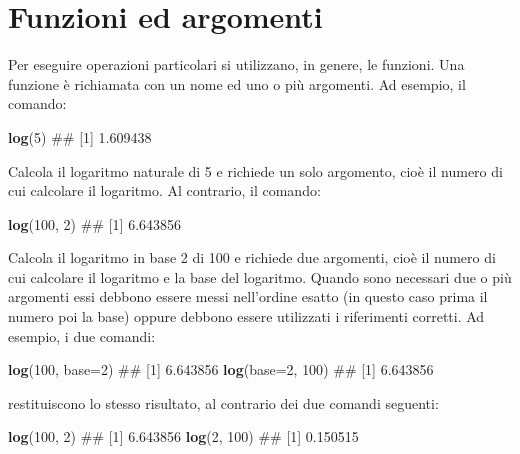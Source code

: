 \documentclass[a4paper,12pt,oneside]{book}
\newenvironment{Shaded}{\begin{snugshade}}{\end{snugshade}}
\newcommand{\KeywordTok}[1]{\textcolor[rgb]{0.13,0.29,0.53}{\textbf{#1}}}
\newcommand{\DataTypeTok}[1]{\textcolor[rgb]{0.13,0.29,0.53}{#1}}
\newcommand{\DecValTok}[1]{\textcolor[rgb]{0.00,0.00,0.81}{#1}}
\newcommand{\NormalTok}[1]{#1}
\theoremstyle{definition}
\theoremstyle{definition}
\theoremstyle{definition}
\theoremstyle{remark}
\begin{document}
\section*{Funzioni ed argomenti}\label{funzioni-ed-argomenti}

Per eseguire operazioni particolari si utilizzano, in genere, le
funzioni. Una funzione è richiamata con un nome ed uno o più argomenti.
Ad esempio, il comando:

\begin{Shaded}
\begin{Highlighting}[]
\KeywordTok{log}\NormalTok{(}\DecValTok{5}\NormalTok{)}
\NormalTok{## [1] 1.609438}
\end{Highlighting}
\end{Shaded}

Calcola il logaritmo naturale di 5 e richiede un solo argomento, cioè il
numero di cui calcolare il logaritmo. Al contrario, il comando:

\begin{Shaded}
\begin{Highlighting}[]
\KeywordTok{log}\NormalTok{(}\DecValTok{100}\NormalTok{, }\DecValTok{2}\NormalTok{)}
\NormalTok{## [1] 6.643856}
\end{Highlighting}
\end{Shaded}

Calcola il logaritmo in base 2 di 100 e richiede due argomenti, cioè il
numero di cui calcolare il logaritmo e la base del logaritmo. Quando
sono necessari due o più argomenti essi debbono essere messi nell'ordine
esatto (in questo caso prima il numero poi la base) oppure debbono
essere utilizzati i riferimenti corretti. Ad esempio, i due comandi:

\begin{Shaded}
\begin{Highlighting}[]
\KeywordTok{log}\NormalTok{(}\DecValTok{100}\NormalTok{, }\DataTypeTok{base=}\DecValTok{2}\NormalTok{)}
\NormalTok{## [1] 6.643856}
\KeywordTok{log}\NormalTok{(}\DataTypeTok{base=}\DecValTok{2}\NormalTok{, }\DecValTok{100}\NormalTok{)}
\NormalTok{## [1] 6.643856}
\end{Highlighting}
\end{Shaded}

restituiscono lo stesso risultato, al contrario dei due comandi
seguenti:

\begin{Shaded}
\begin{Highlighting}[]
\KeywordTok{log}\NormalTok{(}\DecValTok{100}\NormalTok{, }\DecValTok{2}\NormalTok{)}
\NormalTok{## [1] 6.643856}
\KeywordTok{log}\NormalTok{(}\DecValTok{2}\NormalTok{, }\DecValTok{100}\NormalTok{)}
\NormalTok{## [1] 0.150515}
\end{Highlighting}
\end{Shaded}
\end{document}
